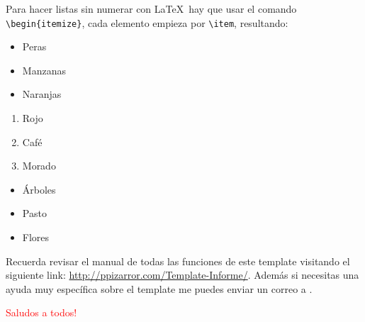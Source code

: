 		Para hacer listas sin numerar con \LaTeX\ hay que usar el comando \texttt{\textbackslash begin\{itemize\}}, cada elemento empieza por \texttt{\textbackslash item}, resultando:
		
		\begin{multicols}{3}
			\begin{itemize}[label={--}]
				\item Peras
				\item Manzanas
				\item Naranjas
			\end{itemize}
			
			\begin{enumerate}[label={*}]
				\item Rojo
				\item Café
				\item Morado
			\end{enumerate}
			
			\begin{itemize}
				\item Árboles
				\item Pasto
				\item Flores
			\end{itemize}
		\end{multicols}
		
		
		Recuerda revisar el manual de todas las funciones de este template visitando el siguiente link: \url{http://ppizarror.com/Template-Informe/}. Además si necesitas una ayuda muy específica sobre el template me puedes enviar un correo a .
		
		\newp \textcolor{red}{Saludos a todos!} \smiley
		
\newpage %